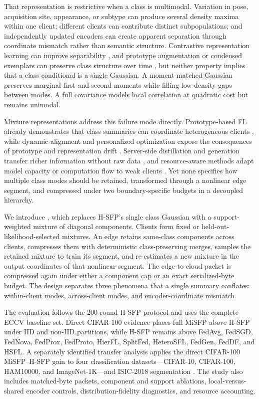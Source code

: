 That representation is restrictive when a class is multimodal. Variation in pose, acquisition site, appearance, or subtype can produce several density maxima within one client; different clients can contribute distinct subpopulations; and independently updated encoders can create apparent separation through coordinate mismatch rather than semantic structure. Contrastive representation learning can improve separability \cite{chen2020simple}, and prototype augmentation or condensed exemplars can preserve class structure over time \cite{9578909,Nguyen_2026_CVPR}, but neither property implies that a class conditional is a single Gaussian. A moment-matched Gaussian preserves marginal first and second moments while filling low-density gaps between modes. A full covariance models local correlation at quadratic cost but remains unimodal.

Mixture representations address this failure mode directly. Prototype-based FL already demonstrates that class summaries can coordinate heterogeneous clients \cite{tan2022fedproto,dai2023tacklingFedProx,10660707}, while dynamic alignment and personalized optimization expose the consequences of prototype and representation drift \cite{bensiah2025feddpa,zhang2020personalized}. Server-side distillation and generation transfer richer information without raw data \cite{lin2020ensemble,venkateswaran2023fedgen}, and resource-aware methods adapt model capacity or computation flow to weak clients \cite{diao2021heterofl,niu2023overcoming,10655220}. Yet none specifies how multiple class modes should be retained, transformed through a nonlinear edge segment, and compressed under two boundary-specific budgets in a decoupled hierarchy.

We introduce \method{}, which replaces H-SFP's single class Gaussian with a support-weighted mixture of diagonal components. Clients form fixed or held-out-likelihood-selected mixtures. An edge retains same-class components across clients, compresses them with deterministic class-preserving merges, samples the retained mixture to train its segment, and re-estimates a new mixture in the output coordinates of that nonlinear segment. The edge-to-cloud packet is compressed again under either a component cap or an exact serialized-byte budget. The design separates three phenomena that a single summary conflates: within-client modes, across-client modes, and encoder-coordinate mismatch.

The evaluation follows the 200-round H-SFP protocol and uses the complete ECCV baseline set. Direct CIFAR-100 evidence places full MiSFP above H-SFP under IID and non-IID partitions, while H-SFP remains above FedAvg, FedSGD, FedNova, FedProx, FedProto, HierFL, SplitFed, HeteroSFL, FedGen, FedDF, and HSFL. A separately identified transfer analysis applies the direct CIFAR-100 MiSFP--H-SFP gain to four classification datasets---CIFAR-10, CIFAR-100, HAM10000, and ImageNet-1K---and ISIC-2018 segmentation \cite{krizhevsky2009learning,tschandl2018ham10000,5206848,8363547}. The study also includes matched-byte packets, component and support ablations, local-versus-shared encoder controls, distribution-fidelity diagnostics, and resource accounting.

